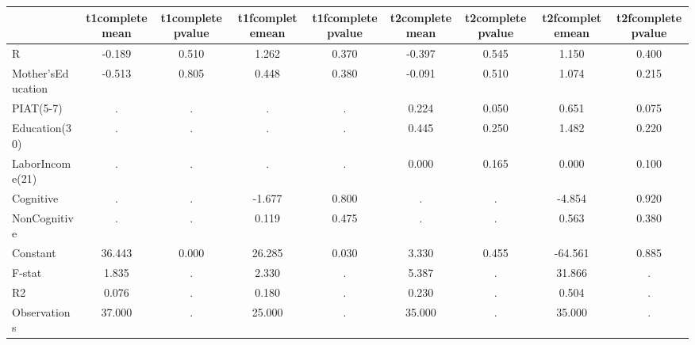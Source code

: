 \begin{table}[htbp]
\begin{tabular}{lcccccccc} \hline \hline
 & t1completemean  & t1completepvalue  & t1fcompletemean  & t1fcompletepvalue  & t2completemean  & t2completepvalue  & t2fcompletemean  & t2fcompletepvalue  \\  \hline 
R &    -0.189 &     0.510 &     1.262 &     0.370 &    -0.397 &     0.545 &     1.150 &     0.400 \\  
Mother'sEducation &    -0.513 &     0.805 &     0.448 &     0.380 &    -0.091 &     0.510 &     1.074 &     0.215 \\  
PIAT(5-7) &         . &         . &         . &         . &     0.224 &     0.050 &     0.651 &     0.075 \\  
Education(30) &         . &         . &         . &         . &     0.445 &     0.250 &     1.482 &     0.220 \\  
LaborIncome(21) &         . &         . &         . &         . &     0.000 &     0.165 &     0.000 &     0.100 \\  
Cognitive &         . &         . &    -1.677 &     0.800 &         . &         . &    -4.854 &     0.920 \\  
NonCognitive &         . &         . &     0.119 &     0.475 &         . &         . &     0.563 &     0.380 \\  
Constant &    36.443 &     0.000 &    26.285 &     0.030 &     3.330 &     0.455 &   -64.561 &     0.885 \\  
F-stat &     1.835 &         . &     2.330 &         . &     5.387 &         . &    31.866 &         . \\  
R2 &     0.076 &         . &     0.180 &         . &     0.230 &         . &     0.504 &         . \\  
Observations &    37.000 &         . &    25.000 &         . &    35.000 &         . &    35.000 &         . \\  
\hline \hline \end{tabular}
\end{table}
